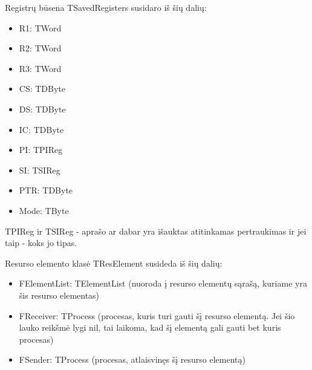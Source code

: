 \documentclass{VUMIFInfKursinis}
\begin{document}
Registrų būsena TSavedRegisters susidaro iš šių dalių:

\begin{itemize}
	\item R1: TWord
	\item R2: TWord
	\item R3: TWord
	\item CS: TDByte
	\item DS: TDByte
	\item IC: TDByte
	\item PI: TPIReg
	\item SI: TSIReg
	\item PTR: TDByte
	\item Mode: TByte
\end{itemize}

TPIReg ir TSIReg - aprašo ar dabar yra išauktas atitinkamas pertraukimas ir jei taip - koks jo tipas.

Resurso elemento klasė TResElement susideda iš šių dalių:

\begin{itemize}
	\item FElementList: TElementList (nuoroda į resurso elementų sąrašą, kuriame yra šis resurso elementas)
	\item FReceiver: TProcess (procesas, kuris turi gauti šį resurso elementą. Jei šio lauko
reikšmė lygi nil, tai laikoma, kad šį elementą gali gauti bet kuris procesas)
	\item FSender: TProcess (procesas, atlaisvinęs šį resurso elementą)
\end{itemize}

\printbibliography[heading=bibintoc] %
\appendix  %
\end{document}
